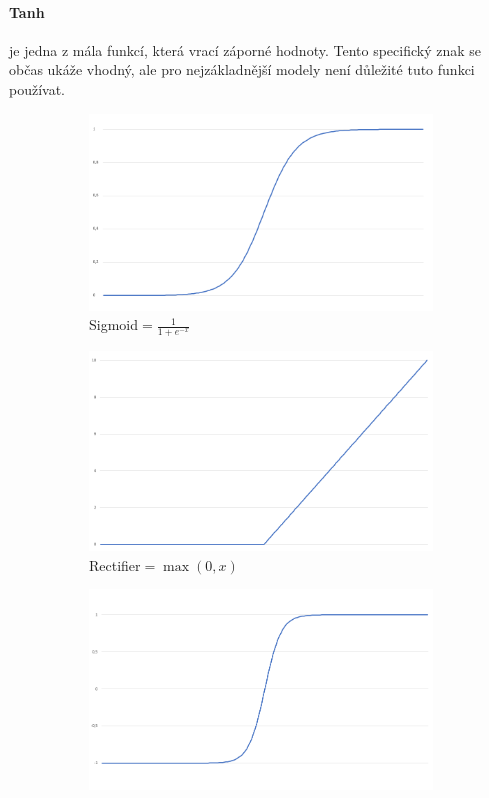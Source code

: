 \documentclass[12pt,a4paper]{report}
\begin{document}
		\paragraph{Tanh}
		je jedna z mála funkcí, která vrací záporné hodnoty. Tento specifický znak se občas ukáže vhodný, ale pro nejzákladnější modely není důležité tuto funkci používat.
		\begin{figure}
			\centering
			\begin{subfigure}[h]{0.3\textwidth}
				\includegraphics[width=\textwidth]{images/sigmoid}
				\caption{Sigmoid$=\frac{1}{1+e^{-x}}$}
				\label{fig:sigmoid}
			\end{subfigure}
			\begin{subfigure}[h]{0.3\textwidth}
				\includegraphics[width=\textwidth]{images/rectifier}
				\caption{Rectifier$=\max(0,x)$}
				\label{fig:rectifier}
			\end{subfigure}
			\begin{subfigure}[h]{0.3\textwidth}
				\includegraphics[width=\textwidth]{images/tanh}

\end{subfigure}
\end{figure}
\end{document}
